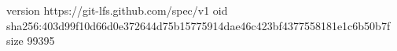 version https://git-lfs.github.com/spec/v1
oid sha256:403d99f10d66d0e372644d75b15775914dae46c423bf4377558181e1c6b50b7f
size 99395
